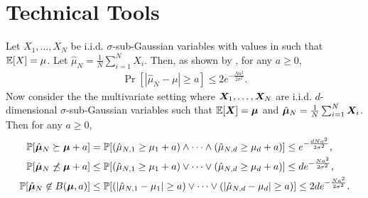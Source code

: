 
\section{Technical Tools}
\label{app:technical_tools}

\begin{fact}
\label{fac:chernoffd}
    Let $X_1, \dots, X_N$ be i.i.d. $\sigma$-sub-Gaussian variables with values in such that $\mathbb{E}[X] = \mu$. Let $\hat \mu_N = \frac{1}{N} \sum_{i=1}^N X_i$. Then, as shown by \cite{Rigollet2015}, for any $a \geq 0$,
    \begin{align*}
        \Pr[|\hat \mu_N - \mu| \geq a] \leq 2 e^{-\frac{N a^2}{2 \sigma^2}}.
    \end{align*}
    Now consider the the multivariate setting where $\boldsymbol{X}_1, \dots, \boldsymbol{X}_N$ are i.i.d. $d$-dimensional $\sigma$-sub-Gaussian variables such that $\mathbb{E}[\boldsymbol{X}] = \boldsymbol{\mu}$ and $\hat {\boldsymbol{\mu}}_N = \frac{1}{N} \sum_{i=1}^N \boldsymbol{X}_i$. Then for any $a \geq 0$,
    \begin{align*}
        \mathbb{P}[\hat {\boldsymbol{\mu}}_N \succeq \boldsymbol{\mu} + a]
        & = \mathbb{P}[(\hat \mu_{N, 1} \geq \mu_1 + a) \wedge \dots \wedge (\hat \mu_{N, d} \geq \mu_d + a)]
        \leq e^{-\frac{d N a^2}{2 \sigma^2}}, \\
        \mathbb{P}[\hat {\boldsymbol{\mu}}_N \not\preceq \boldsymbol{\mu} + a]
        & \leq \mathbb{P}[(\hat \mu_{N, 1} \geq \mu_1 + a) \vee \dots \vee (\hat \mu_{N, d} \geq \mu_d + a)]
        \leq d e^{-\frac{N a^2}{2 \sigma^2}}, \\
        \mathbb{P}[\hat {\boldsymbol{\mu}}_N \not\in B(\boldsymbol{\mu}, a)]
        & \leq \mathbb{P}[(|\hat \mu_{N, 1} - \mu_1| \geq a) \vee \dots \vee (|\hat \mu_{N, d} - \mu_d| \geq a)]
        \leq 2 d e^{-\frac{N a^2}{2 \sigma^2}}.
    \end{align*}
\end{fact}


